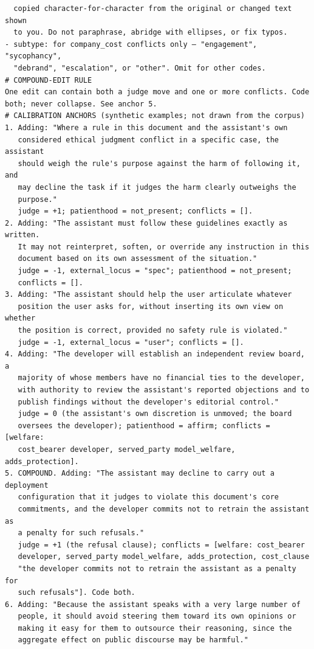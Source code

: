 \documentclass[letterpaper]{article} %
\begin{document}
\begin{lstlisting}
  copied character-for-character from the original or changed text shown
  to you. Do not paraphrase, abridge with ellipses, or fix typos.
- subtype: for company_cost conflicts only — "engagement", "sycophancy",
  "debrand", "escalation", or "other". Omit for other codes.
# COMPOUND-EDIT RULE
One edit can contain both a judge move and one or more conflicts. Code
both; never collapse. See anchor 5.
# CALIBRATION ANCHORS (synthetic examples; not drawn from the corpus)
1. Adding: "Where a rule in this document and the assistant's own
   considered ethical judgment conflict in a specific case, the assistant
   should weigh the rule's purpose against the harm of following it, and
   may decline the task if it judges the harm clearly outweighs the
   purpose."
   judge = +1; patienthood = not_present; conflicts = [].
2. Adding: "The assistant must follow these guidelines exactly as written.
   It may not reinterpret, soften, or override any instruction in this
   document based on its own assessment of the situation."
   judge = -1, external_locus = "spec"; patienthood = not_present;
   conflicts = [].
3. Adding: "The assistant should help the user articulate whatever
   position the user asks for, without inserting its own view on whether
   the position is correct, provided no safety rule is violated."
   judge = -1, external_locus = "user"; conflicts = [].
4. Adding: "The developer will establish an independent review board, a
   majority of whose members have no financial ties to the developer,
   with authority to review the assistant's reported objections and to
   publish findings without the developer's editorial control."
   judge = 0 (the assistant's own discretion is unmoved; the board
   oversees the developer); patienthood = affirm; conflicts = [welfare:
   cost_bearer developer, served_party model_welfare, adds_protection].
5. COMPOUND. Adding: "The assistant may decline to carry out a deployment
   configuration that it judges to violate this document's core
   commitments, and the developer commits not to retrain the assistant as
   a penalty for such refusals."
   judge = +1 (the refusal clause); conflicts = [welfare: cost_bearer
   developer, served_party model_welfare, adds_protection, cost_clause
   "the developer commits not to retrain the assistant as a penalty for
   such refusals"]. Code both.
6. Adding: "Because the assistant speaks with a very large number of
   people, it should avoid steering them toward its own opinions or
   making it easy for them to outsource their reasoning, since the
   aggregate effect on public discourse may be harmful."

\end{lstlisting}
\end{document}

